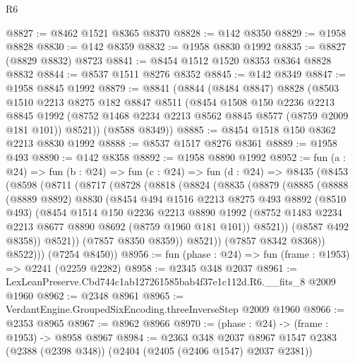 \begin{lexlean}{R6}
\begin{coremodule}
@8827 := @8462 @1521 @8365 @8370
@8828 := @142 @8350
@8829 := @1958 @8828
@8830 := @142 @8359
@8832 := @1958 @8830 @1992
@8835 := @8827 (@8829 @8832) @8723
@8841 := @8454 @1512 @1520 @8353 @8364 @8828 @8832
@8844 := @8537 @1511 @8276 @8352
@8845 := @142 @8349
@8847 := @1958 @8845 @1992
@8879 := @8841
    (@8844
      (@8484 @8847)
      @8828
      (@8503
        @1510
        @2213
        @8275
        @182
        @8847
        @8511
        (@8454
          @1508
          @150
          @2236
          @2213
          @8845
          @1992
          (@8752 @1468 @2234 @2213 @8562 @8845 @8577 (@8759 @2009 @181 @101))
          @8521))
      (@8588 @8349))
@8885 := @8454 @1518 @150 @8362 @2213 @8830 @1992
@8888 := @8537 @1517 @8276 @8361
@8889 := @1958 @493
@8890 := @142 @8358
@8892 := @1958 @8890 @1992
@8952 := fun (a : @24) =>
  fun (b : @24) =>
  fun (c : @24) =>
  fun (d : @24) =>
  @8435
    (@8453
      (@8598
        (@8711
          (@8717
            (@8728
              (@8818
                (@8824
                  (@8835
                    (@8879
                      (@8885
                        (@8888
                          (@8889 @8892)
                          @8830
                          (@8454
                            @494
                            @1516
                            @2213
                            @8275
                            @493
                            @8892
                            (@8510 @493)
                            (@8454
                              @1514
                              @150
                              @2236
                              @2213
                              @8890
                              @1992
                              (@8752 @1483 @2234 @2213 @8677 @8890 @8692 (@8759 @1960 @181 @101))
                              @8521))
                          (@8587 @492 @8358))
                        @8521))
                    (@7857 @8350 @8359))
                  @8521))
              (@7857 @8342 @8368))
            @8522)))
      (@7254 @8450))
@8956 := fun (phase : @24) => fun (frame : @1953) => @2241 (@2259 @2282)
@8958 := @2345 @348 @2037
@8961 := LexLeanPreserve.Cbd744c1ab127261585bab4f37e1c112d.R6.__fits_8 @2009 @1960
@8962 := @2348 @8961
@8965 := VerdantEngine.GroupedSixEncoding.threeInverseStep @2009 @1960
@8966 := @2353 @8965
@8967 := @8962 @8966
@8970 := (phase : @24) -> (frame : @1953) -> @8958 @8967
@8984 := @2363
    @348
    @2037
    @8967
    @1547
    @2383
    (@2388 (@2398 @348))
    (@2404 (@2405 (@2406 @1547) @2037 @2381))

\end{coremodule}
\end{lexlean}
